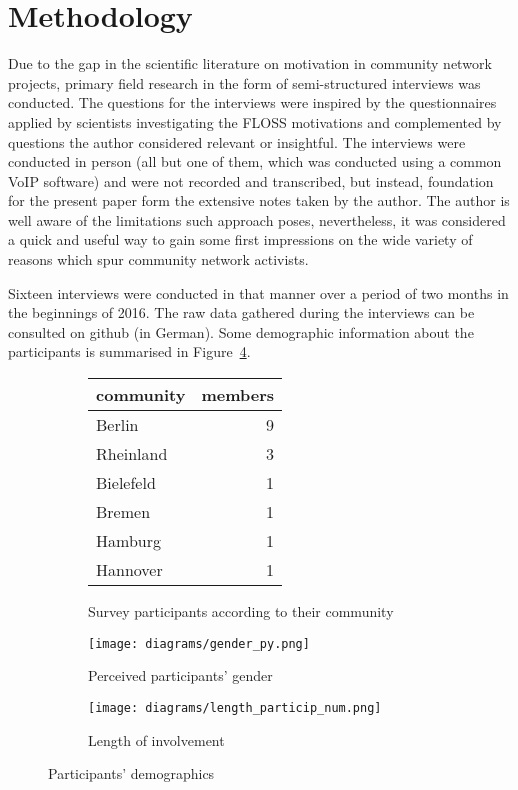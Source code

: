\section{Methodology}

Due to the gap in the scientific literature on motivation in community network projects, primary field research in the form of semi-structured interviews was conducted.
The questions for the interviews were inspired by the questionnaires applied by scientists investigating the FLOSS motivations\cite{HarOu2002}\cite{LakWo2005} and complemented by questions the author considered relevant or insightful.
The interviews were conducted in person (all but one of them, which was conducted using a common VoIP software) and were not recorded and transcribed, but instead, foundation for the present paper form the extensive notes taken by the author.
The author is well aware of the limitations such approach poses, nevertheless, it was considered a quick and useful way to gain some first impressions on the wide variety of reasons which spur community network activists.

Sixteen interviews were conducted in that manner over a period of two months in the beginnings of 2016.
The raw data gathered during the interviews can be consulted on github\cite{FFInterviews} (in German).
Some demographic information about the participants is summarised in Figure~\ref{fig:demography}.

\begin{figure}[h]
  \begin{subfigure}[h]{\textwidth}
    \centering
    \begin{tabular}{ l | r }
      \hline
      \textbf{community} & \textbf{members}\\
      \hline
      Berlin & 9 \\
      Rheinland & 3 \\
      Bielefeld & 1 \\
      Bremen & 1 \\
      Hamburg & 1 \\
      Hannover & 1 \\
      \hline
    \end{tabular}
  \caption{Survey participants according to their community}
  \label{tab:communities}
  \end{subfigure}
  \qquad
  \begin{subfigure}[h]{0.45\textwidth}
    \texttt{[image: diagrams/gender\_py.png]}
    \caption{Perceived participants' gender}
    \label{fig:gender}
  \end{subfigure}
  \qquad
  \begin{subfigure}[h]{0.45\textwidth}
    \centering
    \texttt{[image: diagrams/length\_particip\_num.png]}
    \caption{Length of involvement}
    \label{fig:length}
  \end{subfigure}
  \caption{Participants' demographics}
  \label{fig:demography}
\end{figure}

